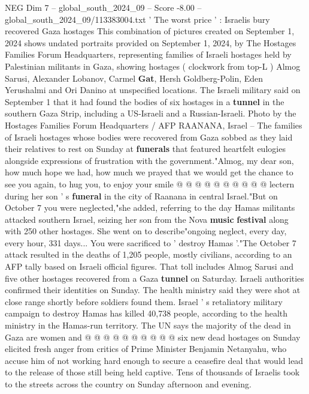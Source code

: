 \begin{textsample}{NEG Dim 7 – global\_south\_2024\_09 – Score -8.00 – global\_south\_2024\_09/113383004.txt}  \label{ex:f7_neg_177}
' The worst price ' : Israelis bury recovered Gaza hostages This combination of pictures created on September 1, 2024 shows undated portraits provided on September 1, 2024, by The Hostages Families Forum Headquarters, representing families of Israeli hostages held by Palestinian militants in Gaza, showing hostages ( clockwork from top-L ) Almog Sarusi, Alexander Lobanov, Carmel \textbf{Gat}, Hersh Goldberg-Polin, Eden Yerushalmi and Ori Danino at unspecified locations.
The Israeli military said on September 1 that it had found the bodies of six hostages in a \textbf{tunnel} in the southern Gaza Strip, including a US-Israeli and a Russian-Israeli.
Photo by the Hostages Families Forum Headquarters / AFP RAANANA, Israel -- The families of Israeli hostages whose bodies were recovered from Gaza sobbed as they laid their relatives to rest on Sunday at \textbf{funerals} that featured heartfelt eulogies alongside expressions of frustration with the government."Almog, my dear son, how much hope we had, how much we prayed that we would get the chance to see you again, to hug you, to enjoy your smile @ @ @ @ @ @ @ @ @ @ lectern during her son ' s \textbf{funeral} in the city of Raanana in central Israel."But on October 7 you were neglected,"she added, referring to the day Hamas militants attacked southern Israel, seizing her son from the Nova \textbf{music} \textbf{festival} along with 250 other hostages.
She went on to describe"ongoing neglect, every day, every hour, 331 days...
You were sacrificed to ' destroy Hamas '."The October 7 attack resulted in the deaths of 1,205 people, mostly civilians, according to an AFP tally based on Israeli official figures.
That toll includes Almog Sarusi and five other hostages recovered from a Gaza \textbf{tunnel} on Saturday.
Israeli authorities confirmed their identities on Sunday.
The health ministry said they were shot at close range shortly before soldiers found them.
Israel ' s retaliatory military campaign to destroy Hamas has killed 40,738 people, according to the health ministry in the Hamas-run territory.
The UN says the majority of the dead in Gaza are women and @ @ @ @ @ @ @ @ @ @ six new dead hostages on Sunday elicited fresh anger from critics of Prime Minister Benjamin Netanyahu, who accuse him of not working hard enough to secure a ceasefire deal that would lead to the release of those still being held captive.
Tens of thousands of Israelis took to the streets across the country on Sunday afternoon and evening.

\end{textsample}
